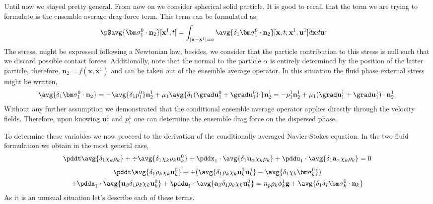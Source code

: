 Until now we stayed pretty general. 
From now on we consider spherical solid particle.
It is good to recall that the term we are trying to formulate is the ensemble average  drag force term. 
This term can be formulated as, 
\begin{align}
    \pSavg{\bm\sigma_1^0\cdot\textbf{n}_2}[\textbf{x}^1,t]
    &=
    \int_{|\textbf{x}-\textbf{x}^1|=a}
    \avg{\delta_1  \bm\sigma_1^0\cdot \textbf{n}_2}
    [\textbf{x},t;\textbf{x}^1,\textbf{u}^1]
    d\textbf{x}
    d\textbf{u}^1
\end{align}
The stress, might be expressed following a Newtonian law, besides, we consider that the particle contribution to this stress is null such that we discard possible contact forces. 
Additionally, note that the normal to the particle $\alpha$ is entirely determined by the position of the latter particle, therefore, $\textbf{n}_2 = f(\textbf{x},\textbf{x}^1)$ and can be taken out of the ensemble average operator. 
In this situation the fluid phase external stress might be written, 
\begin{equation*}
    \avg{\delta_1  \bm\sigma_1^0\cdot \textbf{n}_2}
    = 
    - \avg{\delta_1  p_1^0 }\textbf{n}_2^1
    + \mu_1 \avg{\delta_1  (\grad \textbf{u}_1^0 + \grad \textbf{u}_1^0)\cdot }\textbf{n}_2^1
    = 
    -   p_1^1 \textbf{n}_2^1
    + \mu_1  (\grad \textbf{u}_1^1 + \grad \textbf{u}_1^1) \cdot \textbf{n}_2^1. 
\end{equation*}
Without any further assumption we demonstrated that the conditional ensemble average operator applies directly through the velocity fields. 
Therefore, upon knowing $\textbf{u}_1^1$ and $p_1^1$ one can determine the ensemble drag force on the dispersed phase. 







To determine these variables we now proceed to the derivation of the conditionally averaged Navier-Stokes equation. 
In the two-fluid formulation we obtain in the most general case, 
\begin{equation}
    \pddt \avg{\delta_1 \chi_k \rho_k}
    +  \div \avg{\delta_1 \chi_k \rho_k \textbf{u}_k^0}
    +  \pddx_1 \cdot
    \avg{\delta_1 \textbf{u}_\alpha \chi_k \rho_k}
    +  \pddu_1 \cdot
    \avg{\delta_1  \textbf{a}_\alpha \chi_k \rho_k}
    = 0
\end{equation}
\begin{multline}
    \pddt \avg{\delta_1 \rho_k \chi_k \textbf{u}_k^0 }
    + \div(
        \avg{\delta_1 \rho_k \chi_k \textbf{u}_k^0 \textbf{u}^0_k  }
    - \avg{\delta_1\chi_k\bm\sigma^0_k})\\
    + \pddx_1 \cdot
        \avg{\textbf{u}_\beta\delta_1 \rho_k \chi_k \textbf{u}_k^0 }
    + \pddu_1 \cdot
        \avg{\textbf{a}_\beta\delta_1 \rho_k \chi_k \textbf{u}_k^0 }
    = n_p  \rho_k \phi_k^1 \textbf{g} 
    + \avg{\delta_1\delta_I \bm\sigma_k^0 \cdot \textbf{n}_k}
\end{multline}
As it is an unusual situation let's describe each of these terms. 

